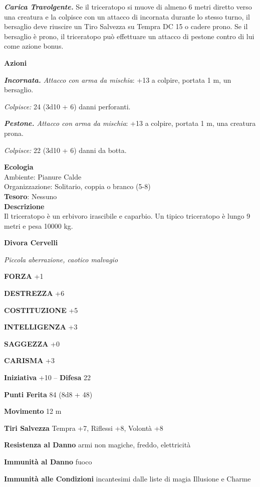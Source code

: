 \begin{multicols}{2}
	\textit{\textbf{Carica Travolgente.}} Se il triceratopo si muove di almeno 6 metri diretto verso una creatura e la colpisce con un attacco di incornata durante lo stesso turno, il bersaglio deve riuscire un Tiro Salvezza su Tempra DC 15 o cadere prono. Se il bersaglio è prono, il triceratopo può effettuare un attacco di pestone contro di lui come azione bonus.

	\textbf{Azioni}

	\textit{\textbf{Incornata.} Attacco con arma da mischia}: +13 a colpire, portata 1 m, un bersaglio.

	\textit{Colpisce:} 24 (3d10 + 6) danni perforanti.

	\textit{\textbf{Pestone.} Attacco con arma da mischia}: +13 a colpire, portata 1 m, una creatura prona.

	\textit{Colpisce:} 22 (3d10 + 6) danni da botta.

	\textbf{Ecologia}\\
	Ambiente: Pianure Calde\\
	Organizzazione: Solitario, coppia o branco (5-8)\\
	\textbf{Tesoro}: Nessuno\\
	\textbf{Descrizione}\\
	Il triceratopo è un erbivoro irascibile e caparbio. Un tipico triceratopo è lungo 9 metri e pesa 10000 kg.

	\medskip{}\textbf{Divora Cervelli}

	\textit{Piccola aberrazione, caotico malvagio}

	\textbf{FORZA} +1

	\textbf{DESTREZZA} +6

	\textbf{COSTITUZIONE} +5

	\textbf{INTELLIGENZA} +3

	\textbf{SAGGEZZA} +0

	\textbf{CARISMA} +3

	\textbf{Iniziativa} +10 -- \textbf{Difesa} 22

	\textbf{Punti Ferita} 84 (8d8 + 48)

	\textbf{Movimento} 12 m

	\textbf{Tiri Salvezza} Tempra +7, Riflessi +8, Volontà +8

	\textbf{Resistenza al Danno} armi non magiche, freddo, elettricità

	\textbf{Immunità al Danno} fuoco

	\textbf{Immunità alle Condizioni} incantesimi dalle liste di magia Illusione e Charme


\end{multicols}
